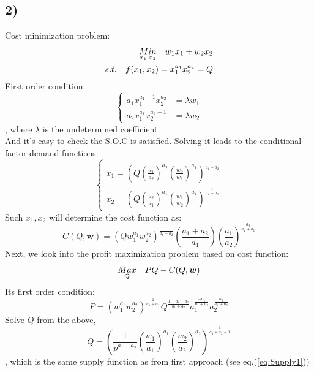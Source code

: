 \documentclass{article}
\begin{document}
\subsection*{2)}
Cost minimization problem:
\begin{align}
\notag \underset{x_1,x_2}{Min}\quad w_1 x_1 + w_2 x_2 \\
\notag s.t.\quad f(x_1,x_2) = x_1^{a_1}x_2^{a_2} = Q
\end{align}
First order condition:
\begin{equation}
	\begin{cases}
	a_1 x_1^{a_1-1} x_2^{a_2} &= \lambda w_1 \\ 
	a_2 x_1^{a_1} x_2^{a_2-1} &= \lambda w_2		
	\end{cases}
\end{equation}
, where $\lambda$ is the undetermined coefficient.\\
And it's easy to check the S.O.C is satisfied. Solving it leads to the conditional factor demand functions:
\begin{equation}
	\begin{cases}
		x_1 = (Q (\frac{a_1}{a_2})^{a_2} (\frac{w_2}{w_1})^{a_1})^{\frac{1}{a_1 + a_2}} \\
		x_2 = (Q (\frac{a_2}{a_1})^{a_1} (\frac{w_1}{w_2})^{a_2})^{\frac{1}{a_1 + a_2}}		
	\end{cases}
\end{equation}
Such $x_1, x_2$ will determine the cost function as:
\begin{equation}
	C(Q,\bm{w}) = (Q w^{a_1}_1 w^{a_2}_2)^{\frac{1}{a_1 + a_2}} (\frac{a_1+a_2}{a_1}) (\frac{a_1}{a_2})^{\frac{a_2}{a_1+a_2}}
\end{equation}
Next, we look into the profit maximization problem based on cost function:
\begin{equation}
	\notag \underset{Q}{Max}\quad PQ-C(Q,\bm{w})
\end{equation}
Its first order condition:
\begin{equation}
	P = (w^{a_1}_1 w^{a_2}_2)^{\frac{1}{a_1+a_2}} Q^{\frac{1 - a_1 - a_2}{a_1 + a_2}} a^{\frac{-a_1}{a_1+a_2}}_1 a^{\frac{a_2}{a_1+a_2}}_2
\end{equation}
Solve $Q$ from the above,
\begin{equation}
	Q = (\frac{1}{p^{a_1+a_2}} (\frac{w_1}{a_1})^{a_1} (\frac{w_2}{a_2})^{a_2} )^{\frac{1}{a_1 + a_2 - 1}}
\end{equation}
, which is the same supply function as from first approach (see eq.(\ref{eq:Supply1}))
\end{document}
